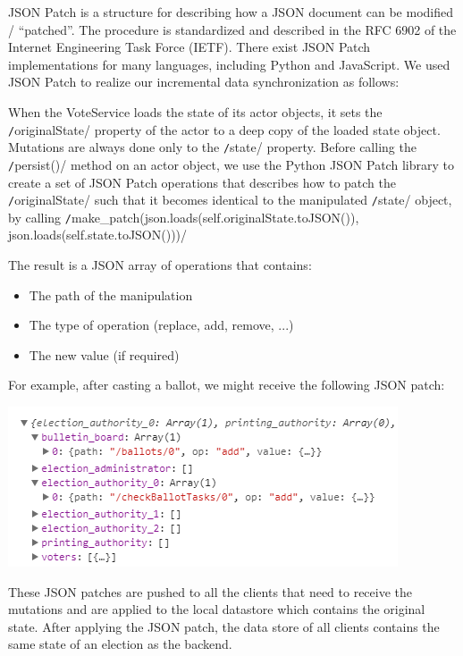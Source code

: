 JSON Patch is a structure for describing how a JSON document can be modified / "`patched"'. The procedure is standardized and described in the RFC 6902 of the Internet Engineering Task Force (IETF). There exist JSON Patch implementations for many languages, including Python and JavaScript. We used JSON Patch to realize our incremental data synchronization as follows:

When the VoteService loads the state of its actor objects, it sets the \texttt/originalState/ property of the actor to a deep copy of the loaded state object. Mutations are always done only to the \texttt/state/ property. Before calling the \texttt/persist()/ method on an actor object, we use the Python JSON Patch library to create a set of JSON Patch operations that describes how to patch the \texttt/originalState/ such that it becomes identical to the manipulated \texttt/state/ object, by calling 
\texttt/make_patch(json.loads(self.originalState.toJSON()), json.loads(self.state.toJSON()))/

The result is a JSON array of operations that contains:
\begin{itemize}
	\item The path of the manipulation
	\item The type of operation (replace, add, remove, ...)
	\item The new value (if required)
\end{itemize}

For example, after casting a ballot, we might receive the following JSON patch:

\begin{center}
\includegraphics[scale=0.62]{assets/jsonpatchexample.png}
\label{JSON Patch example}%
\end{center}
These JSON patches are pushed to all the clients that need to receive the mutations and are applied to the local datastore which contains the original state. After applying the JSON patch, the data store of all clients contains the same state of an election as the backend.

